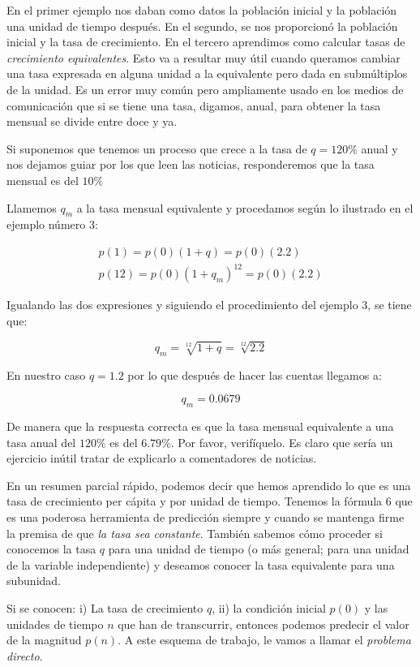 En el primer ejemplo nos daban como datos la población inicial y la población una unidad de tiempo después. En el segundo, se nos proporcionó la población inicial y la tasa de crecimiento. En el tercero aprendimos como calcular tasas de \emph{crecimiento equivalentes}. Esto va a resultar muy útil cuando queramos cambiar una tasa expresada en alguna unidad a la equivalente pero dada en submúltiplos de la unidad. Es un error muy común pero ampliamente usado en los medios de comunicación que si se tiene una tasa, digamos, anual, para obtener la tasa mensual se divide entre doce y ya. 

Si suponemos que tenemos un proceso que crece a la tasa de $q=120\%$ anual y nos dejamos guiar por los que leen las noticias, responderemos que la tasa mensual es del $10\%$

Llamemos $q_m$ a la tasa mensual equivalente y procedamos según lo ilustrado en el ejemplo número $3$: 

\begin{align*}
p(1)=p(0)(1+q)=p(0)(2.2)\\
p(12)=p(0)(1+q_m)^{12}=p(0)(2.2)
\end{align*}

Igualando las dos expresiones y siguiendo el procedimiento del ejemplo 3, se tiene que:

\[
q_m=\sqrt[12]{1+q}=\sqrt[12]{2.2}
\]

En nuestro caso $q=1.2$ por lo que después de hacer las cuentas llegamos a:

\[
q_m=0.0679
\]

De manera que la respuesta correcta es que la tasa mensual equivalente a una tasa anual del $120\%$ es del $6.79\%$. Por favor, verifíquelo. Es claro que sería un ejercicio inútil tratar de explicarlo a comentadores de noticias.

En un resumen parcial rápido, podemos decir que hemos aprendido lo que es una tasa de crecimiento per cápita y por unidad de tiempo. Tenemos la fórmula $6$ que es una poderosa herramienta de predicción siempre y cuando se mantenga firme la premisa de que \emph{la tasa sea constante}. También sabemos cómo proceder si conocemos la tasa $q$ para una unidad de tiempo (o más general; para una unidad de la variable independiente) y deseamos conocer la tasa equivalente para una subunidad. 

Si se conocen: i) La tasa de crecimiento $q$, ii) la condición inicial $p(0)$ y las unidades de tiempo $n$ que han de transcurrir, entonces podemos predecir el valor de la magnitud $p(n)$. A este esquema de trabajo, le vamos a llamar el \emph{problema directo}.

